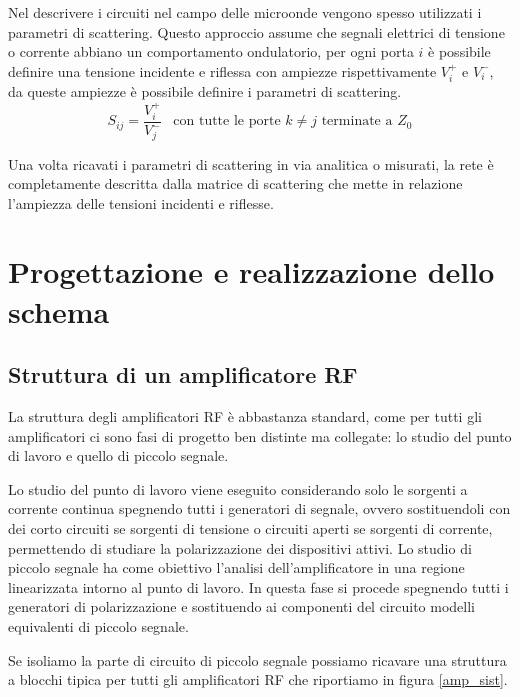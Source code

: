\documentclass[12pt,oneside]{book}
\begin{document}

Nel descrivere i circuiti nel campo delle microonde vengono spesso utilizzati i parametri di scattering. Questo approccio assume che segnali elettrici di tensione o corrente abbiano un comportamento ondulatorio, per ogni porta $i$ è possibile definire una tensione incidente e riflessa con ampiezze rispettivamente $V_{i}^{+}$ e $V_{i}^{-}$, da queste ampiezze è possibile definire i parametri di scattering.
\begin{equation}
    S_{ij} = \dfrac{V_{i}^{+}}{V_{j}^{-}} \hspace{10pt} \text{con tutte le porte $k \neq j$ terminate a $Z_0$}
\end{equation}

Una volta ricavati i parametri di scattering in via analitica o misurati, la rete è completamente descritta dalla matrice di scattering che mette in relazione l'ampiezza delle tensioni incidenti e riflesse.



\chapter{Progettazione e realizzazione dello schema}
\section{Struttura di un amplificatore RF}
La struttura degli amplificatori RF è abbastanza standard, come per tutti gli amplificatori ci sono fasi di progetto ben distinte ma collegate: lo studio del punto di lavoro e quello di piccolo segnale.

Lo studio del punto di lavoro viene eseguito considerando solo le sorgenti a corrente continua spegnendo tutti i generatori di segnale, ovvero sostituendoli con dei corto circuiti se sorgenti  di tensione o circuiti aperti se sorgenti di corrente, permettendo di studiare la polarizzazione dei dispositivi attivi.
Lo studio di piccolo segnale ha come obiettivo l'analisi dell'amplificatore in una regione linearizzata intorno al punto di lavoro. In questa fase si procede spegnendo tutti i generatori di polarizzazione e sostituendo ai componenti del circuito modelli equivalenti di piccolo segnale.

Se isoliamo la parte di circuito di piccolo segnale possiamo ricavare una struttura a blocchi tipica per tutti gli amplificatori RF che riportiamo in figura \ref{amp_sist}.
\end{document}
